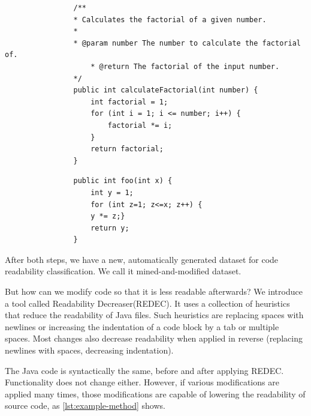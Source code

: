 \documentclass[%
class=scrreprt,
chapterprefix=false,%
open=right,%
twoside=false,%
paper=a4,%
logofile={Logo\_zentral\_farbig\_EN.png},%
thesistype=master,%
UKenglish,%
]{se2thesis}
\theoremstyle{definition}
\newcommand{\RDH}{Readability Decreaser\xspace}
\newcommand{\rdh}{REDEC\xspace}
\newcommand{\RDHa}{\RDH (\rdh)\xspace} %
\begin{document}
	\begin{listing}[tb]
		\begin{sublisting}{\linewidth}
			\begin{verbatim}
				/**
				* Calculates the factorial of a given number.
				*
				* @param number The number to calculate the factorial of.
					* @return The factorial of the input number.
				*/
				public int calculateFactorial(int number) {
					int factorial = 1;
					for (int i = 1; i <= number; i++) {
						factorial *= i;
					}
					return factorial;
				}
			\end{verbatim}
			\caption{An example of a simple and well readable Java method.}
			\label{lst:example-method-well}
		\end{sublisting}		
		\begin{sublisting}{\linewidth}
			\begin{verbatim}
				public int foo(int x) {
					int y = 1;
					for (int z=1; z<=x; z++) {
					y *= z;}
					return y;
				}
			\end{verbatim}
			\caption{The same example as in \autoref{lst:example-method-well} but modified for poor readability.}
			\label{lst:example-method-badly}
		\end{sublisting}
		\caption{Well readable (\autoref{lst:example-method-well}) vs. poorly readable (\autoref{lst:example-method-badly}) code.}
		\label{lst:example-method}
	\end{listing}
	
	After both steps, we have a new, automatically generated dataset for code readability classification. We call it mined-and-modified dataset.
	
	But how can we modify code so that it is less readable afterwards? We introduce a tool called \RDHa. It uses a collection of heuristics that reduce the readability of Java files. Such heuristics are replacing spaces with newlines or increasing the indentation of a code block by a tab or multiple spaces. Most changes also decrease readability when applied in reverse (replacing newlines with spaces, decreasing indentation).
	
	The Java code is syntactically the same, before and after applying \rdh. Functionality does not change either. However, if various modifications are applied many times, those modifications are capable of lowering the readability of source code, as \autoref{lst:example-method} shows.
\end{document}
